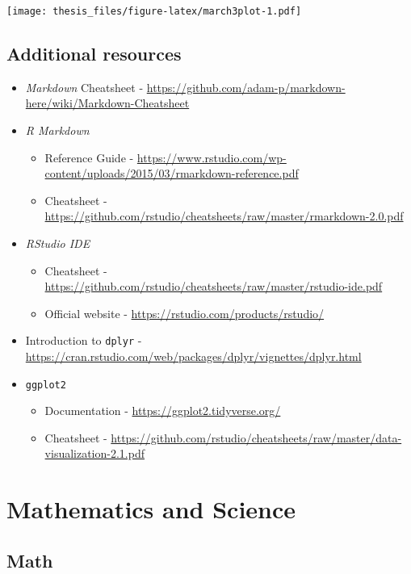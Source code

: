 \documentclass[12pt,twoside]{reedthesis}
\providecommand{\tightlist}{%
  \setlength{\itemsep}{0pt}\setlength{\parskip}{0pt}}
\begin{document}
\texttt{[image: thesis\_files/figure-latex/march3plot-1.pdf]}

\hypertarget{additional-resources}{%
\section{Additional resources}\label{additional-resources}}
\begin{itemize}
\item
  \emph{Markdown} Cheatsheet - \url{https://github.com/adam-p/markdown-here/wiki/Markdown-Cheatsheet}
\item
  \emph{R Markdown}
  \begin{itemize}
  \tightlist
  \item
    Reference Guide - \url{https://www.rstudio.com/wp-content/uploads/2015/03/rmarkdown-reference.pdf}
  \item
    Cheatsheet - \url{https://github.com/rstudio/cheatsheets/raw/master/rmarkdown-2.0.pdf}
  \end{itemize}
\item
  \emph{RStudio IDE}
  \begin{itemize}
  \tightlist
  \item
    Cheatsheet - \url{https://github.com/rstudio/cheatsheets/raw/master/rstudio-ide.pdf}
  \item
    Official website - \url{https://rstudio.com/products/rstudio/}
  \end{itemize}
\item
  Introduction to \texttt{dplyr} - \url{https://cran.rstudio.com/web/packages/dplyr/vignettes/dplyr.html}
\item
  \texttt{ggplot2}
  \begin{itemize}
  \tightlist
  \item
    Documentation - \url{https://ggplot2.tidyverse.org/}
  \item
    Cheatsheet - \url{https://github.com/rstudio/cheatsheets/raw/master/data-visualization-2.1.pdf}
  \end{itemize}
\end{itemize}
\hypertarget{math-sci}{%
\chapter{Mathematics and Science}\label{math-sci}}

\hypertarget{math}{%
\section{Math}\label{math}}
\end{document}
